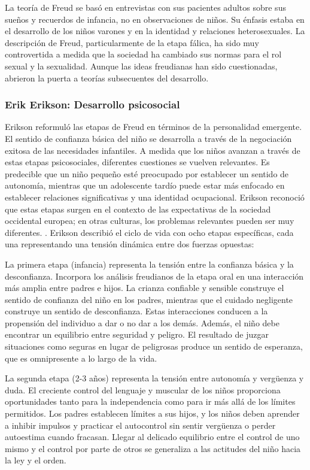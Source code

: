 \documentclass[11pt,letterpaper]{report}
\begin{document}
La teoría de Freud se basó en entrevistas con sus pacientes adultos sobre sus
sueños y recuerdos de infancia, no en observaciones de niños. Su énfasis
estaba en el desarrollo de los niños varones y en la identidad y relaciones
heterosexuales. La descripción de Freud, particularmente de la etapa fálica, ha
sido muy controvertida a medida que la sociedad ha cambiado sus normas para el
rol sexual y la sexualidad. \cite{Feldman3} Aunque las ideas freudianas han
sido cuestionadas, abrieron la puerta a teorías subsecuentes del desarrollo.
\cite{Nelson19}

\subsubsection{Erik Erikson: Desarrollo psicosocial}
Erikson reformuló las etapas de Freud en términos de la personalidad emergente.
El sentido de confianza básica del niño se desarrolla a través de la
negociación exitosa de las necesidades infantiles. A medida que los niños
avanzan a través de estas etapas psicosociales, diferentes cuestiones se
vuelven relevantes. Es predecible que un niño pequeño esté preocupado por
establecer un sentido de autonomía, mientras que un adolescente tardío puede
estar más enfocado en establecer relaciones significativas y una identidad
ocupacional. Erikson reconoció que estas etapas surgen en el contexto de las
expectativas de la sociedad occidental europea; en otras culturas, los
problemas relevantes pueden ser muy diferentes. \cite{Nelson19}. Erikson
describió el ciclo de vida con ocho etapas específicas, cada una representando
una tensión dinámica entre dos fuerzas opuestas:

La primera etapa (infancia) representa la tensión entre la confianza básica y
la desconfianza. Incorpora los análisis freudianos de la etapa oral en una
interacción más amplia entre padres e hijos. La crianza confiable y sensible
construye el sentido de confianza del niño en los padres, mientras que el
cuidado negligente construye un sentido de desconfianza. Estas interacciones
conducen a la propensión del individuo a dar o no dar a los demás. Además, el
niño debe encontrar un equilibrio entre seguridad y peligro. El resultado de
juzgar situaciones como seguras en lugar de peligrosas produce un sentido de
esperanza, que es omnipresente a lo largo de la vida. \cite{Feldman3}

La segunda etapa (2-3 años) representa la tensión entre autonomía y vergüenza y
duda. El creciente control del lenguaje y muscular de los niños proporciona
oportunidades tanto para la independencia como para ir más allá de los límites
permitidos. Los padres establecen límites a sus hijos, y los niños deben
aprender a inhibir impulsos y practicar el autocontrol sin sentir vergüenza o
perder autoestima cuando fracasan. Llegar al delicado equilibrio entre el
control de uno mismo y el control por parte de otros se generaliza a las
actitudes del niño hacia la ley y el orden. \cite{Feldman3}
\end{document}
